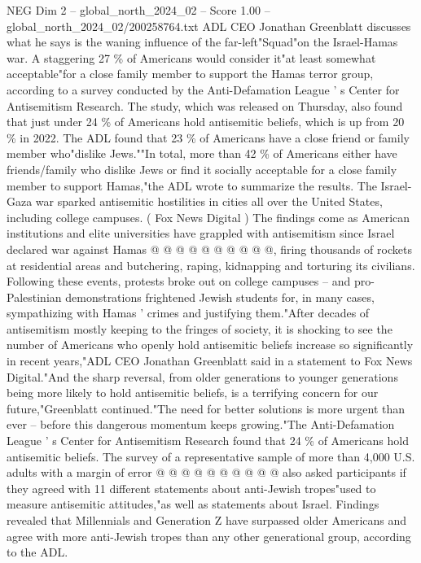 \begin{textsample}{NEG Dim 2 – global\_north\_2024\_02 – Score 1.00 – global\_north\_2024\_02/200258764.txt}  \label{ex:f2_neg_178}
ADL CEO Jonathan Greenblatt discusses what he says is the waning influence of the far-left"Squad"on the Israel-Hamas war.
A staggering 27 \% of Americans would consider it"at least somewhat acceptable"for a close family member to support the Hamas terror group, according to a survey conducted by the Anti-Defamation League ' s Center for Antisemitism Research.
The study, which was released on Thursday, also found that just under 24 \% of Americans hold antisemitic beliefs, which is up from 20 \% in 2022.
The ADL found that 23 \% of Americans have a close friend or family member who"dislike Jews.""In total, more than 42 \% of Americans either have friends/family who dislike Jews or find it socially acceptable for a close family member to support Hamas,"the ADL wrote to summarize the results.
The Israel-Gaza war sparked antisemitic hostilities in cities all over the United States, including college campuses. ( Fox News Digital ) The findings come as American institutions and elite universities have grappled with antisemitism since Israel declared war against Hamas @ @ @ @ @ @ @ @ @ @, firing thousands of rockets at residential areas and butchering, raping, kidnapping and torturing its civilians.
Following these events, protests broke out on college campuses -- and pro-Palestinian demonstrations frightened Jewish students for, in many cases, sympathizing with Hamas ' crimes and justifying them."After decades of antisemitism mostly keeping to the fringes of society, it is shocking to see the number of Americans who openly hold antisemitic beliefs increase so significantly in recent years,"ADL CEO Jonathan Greenblatt said in a statement to Fox News Digital."And the sharp reversal, from older generations to younger generations being more likely to hold antisemitic beliefs, is a terrifying concern for our future,"Greenblatt continued."The need for better solutions is more urgent than ever -- before this dangerous momentum keeps growing."The Anti-Defamation League ' s Center for Antisemitism Research found that 24 \% of Americans hold antisemitic beliefs.
The survey of a representative sample of more than 4,000 U.S. adults with a margin of error @ @ @ @ @ @ @ @ @ @ also asked participants if they agreed with 11 different statements about anti-Jewish tropes"used to measure antisemitic attitudes,"as well as statements about Israel.
Findings revealed that Millennials and Generation Z have surpassed older Americans and agree with more anti-Jewish tropes than any other generational group, according to the ADL.

\end{textsample}
